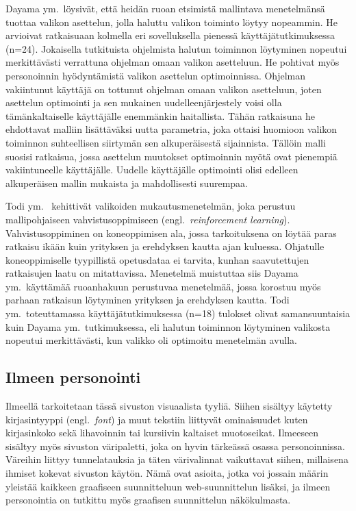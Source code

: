 \documentclass[finnish, 12pt, a4paper, elec, utf8, a-1b]{aaltothesis}
\begin{document}
Dayama ym.~löysivät, että heidän ruoan etsimistä mallintava menetelmänsä tuottaa
valikon asettelun, jolla haluttu valikon toiminto löytyy nopeammin. He arvioivat
ratkaisuaan kolmella eri sovelluksella pienessä käyttäjätutkimuksessa (n=24).
Jokaisella tutkituista ohjelmista halutun toiminnon löytyminen nopeutui
merkittävästi verrattuna ohjelman omaan valikon asetteluun. He pohtivat myös
personoinnin hyödyntämistä valikon asettelun optimoinnissa. Ohjelman vakiintunut
käyttäjä on tottunut ohjelman omaan valikon asetteluun, joten asettelun
optimointi ja sen mukainen uudelleenjärjestely voisi olla tämänkaltaiselle
käyttäjälle enemmänkin haitallista. Tähän ratkaisuna he ehdottavat malliin
lisättäväksi uutta parametria, joka ottaisi huomioon valikon toiminnon
suhteellisen siirtymän sen alkuperäisestä sijainnista. Tällöin malli suosisi
ratkaisua, jossa asettelun muutokset optimoinnin myötä ovat pienempiä
vakiintuneelle käyttäjälle. Uudelle käyttäjälle optimointi olisi edelleen
alkuperäisen mallin mukaista ja mahdollisesti suurempaa.

Todi ym.~\cite{10.1145/3411764.3445497} kehittivät valikoiden
mukautusmenetelmän, joka perustuu mallipohjaiseen vahvistusoppimiseen
(engl.~\textit{reinforcement learning}). Vahvistusoppiminen on koneoppimisen
ala, jossa tarkoituksena on löytää paras ratkaisu ikään kuin yrityksen ja
erehdyksen kautta ajan kuluessa. Ohjatulle koneoppimiselle tyypillistä
opetusdataa ei tarvita, kunhan saavutettujen ratkaisujen laatu on mitattavissa.
Menetelmä muistuttaa siis Dayama ym.~käyttämää ruoanhakuun perustuvaa
menetelmää, jossa korostuu myös parhaan ratkaisun löytyminen yrityksen ja
erehdyksen kautta. Todi ym.~toteuttamassa käyttäjätutkimuksessa (n=18) tulokset
olivat samansuuntaisia kuin Dayama ym.~tutkimuksessa, eli halutun toiminnon
löytyminen valikosta nopeutui merkittävästi, kun valikko oli optimoitu
menetelmän avulla.

\subsection{Ilmeen personointi}

Ilmeellä tarkoitetaan tässä sivuston visuaalista tyyliä. Siihen sisältyy
käytetty kirjasintyyppi (engl.~\textit{font}) ja muut tekstiin liittyvät
ominaisuudet kuten kirjasinkoko sekä lihavoinnin tai kursiivin kaltaiset
muotoseikat. Ilmeeseen sisältyy myös sivuston väripaletti, joka on hyvin
tärkeässä osassa personoinnissa. Väreihin liittyy tunnelatauksia ja täten
värivalinnat vaikuttavat siihen, millaisena ihmiset kokevat sivuston käytön.
Nämä ovat asioita, jotka voi jossain määrin yleistää kaikkeen graafiseen
suunnitteluun web-suunnittelun lisäksi, ja ilmeen personointia on tutkittu myös
graafisen suunnittelun näkökulmasta.
\end{document}
